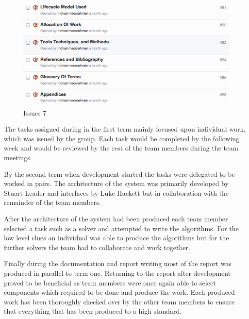\begin{figure}[H]
  \centering
  \includegraphics[width=\linewidth]{images/issues7.png}
  \caption{Issues 7}
  \label{fig:issues7}
\end{figure}

The tasks assigned during in the first term mainly focused upon individual work,
which was issued by the group. Each task would be completed by the following
week and would be reviewed by the rest of the team members during the team
meetings.

By the second term when development started the tasks were delegated to be
worked in pairs. The architecture of the system was primarily developed by
Stuart Leader and interfaces by Luke Hackett but in collaboration with the
remainder of the team members. 

After the architecture of the system had been produced each team member selected
a task such as a solver and attempted to write the algorithms. For the low level
clues an individual was able to produce the algorithms but for the further
solvers the team had to collaborate and work together.

Finally during the documentation and report writing most of the report was
produced in parallel to term one. Returning to the report after development
proved to be beneficial as team members were once again able to select
components which required to be done and produce the work. Each produced work
has been thoroughly checked over by the other team members to ensure that
everything that has been produced to a high standard.
